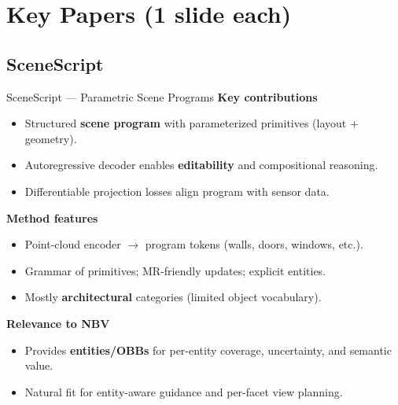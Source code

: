 \documentclass[10pt,aspectratio=169]{beamer}
\begin{document}
\section{Key Papers (1 slide each)}

\subsection{SceneScript}
\begin{frame}{SceneScript --- Parametric Scene Programs}
\textbf{Key contributions}~\cite{SceneScript-avetisyan2024}
\begin{itemize}
  \item Structured \textbf{scene program} with parameterized primitives (layout + geometry).
  \item Autoregressive decoder enables \textbf{editability} and compositional reasoning.
  \item Differentiable projection losses align program with sensor data.
\end{itemize}
\textbf{Method features}
\begin{itemize}
  \item Point-cloud encoder $\rightarrow$ program tokens (walls, doors, windows, etc.).
  \item Grammar of primitives; MR-friendly updates; explicit entities.
  \item Mostly \textbf{architectural} categories (limited object vocabulary).
\end{itemize}
\textbf{Relevance to NBV}
\begin{itemize}
  \item Provides \textbf{entities/OBBs} for per-entity coverage, uncertainty, and semantic value.
  \item Natural fit for entity-aware guidance and per-facet view planning.
\end{itemize}
\end{frame}
\end{document}
